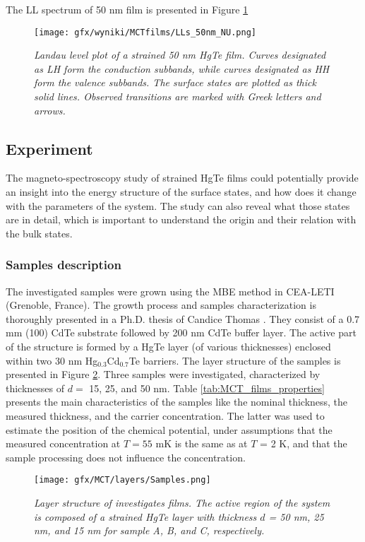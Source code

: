 \documentclass[titlepage,a4paper]{book}
\newcommand{\wciecie}{\quad\phantom{v}}
\begin{document}
The LL spectrum of 50 nm film is presented in Figure \ref{fig:LL_50nm}

\begin{figure}[ht]
	\centering
	\texttt{[image: gfx/wyniki/MCTfilms/LLs\_50nm\_NU.png]}
	\vspace{-10pt}
	\caption{\textit{Landau level plot of a strained 50 nm HgTe film. Curves designated as LH form the conduction subbands, while curves designated as HH form the valence subbands. The surface states are plotted as thick solid lines. Observed transitions are marked with Greek letters and arrows.}}
	\label{fig:LL_50nm}
\end{figure} 

\clearpage
\subsection{Experiment}
\wciecie
The magneto-spectroscopy study of strained HgTe films could potentially provide an insight into the energy structure of the surface states, and how does it change with the parameters of the system. The study can also reveal what those states are in detail, which is important to understand the origin and their relation with the bulk states.
 
\subsubsection{Samples description}
\wciecie
The investigated samples were grown using the MBE method in CEA-LETI (Grenoble, France). The growth process and samples characterization is thoroughly presented in a Ph.D. thesis of Candice Thomas \cite{Thomas_PhD}. They consist of a 0.7 mm (100) CdTe substrate followed by 200 nm CdTe buffer layer. The active part of the structure is formed by a HgTe layer (of various thicknesses) enclosed within two 30 nm Hg$_{0.3}$Cd$_{0.7}$Te barriers. The layer structure of the samples is presented in Figure \ref{fig:Samples_layers}. Three samples were investigated, characterized by thicknesses of $d =$ 15, 25, and 50 nm. Table \ref{tab:MCT_films_properties} presents the main characteristics of the samples like the nominal thickness, the measured thickness, and the carrier concentration. The latter was used to estimate the position of the chemical potential, under assumptions that the measured concentration at $T = 55$ mK is the same as at $T$ = 2 K, and that the sample processing does not influence the concentration.

\begin{figure}[ht]
	\centering
	\texttt{[image: gfx/MCT/layers/Samples.png]}
	\vspace{-10pt}
	\caption{\textit{Layer structure of investigates films. The active region of the system is composed of a strained HgTe layer with thickness $d$ = 50 nm, 25 nm, and 15 nm for sample A, B, and C, respectively.}}
	\label{fig:Samples_layers}
\end{figure} 
\end{document}
